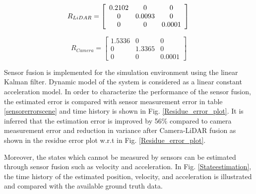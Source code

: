\begin{equation}
    R_{LiDAR} = 
    \left[\begin{array}{ccc}
    0.2102 & 0 & 0 \\
    0 & 0.0093 & 0 \\
    0 & 0 & 0.0001
    \end{array}\right] \\
\end{equation}

\begin{equation}
    R_{Camera} =
    \left[\begin{array}{ccc}
    1.5336 & 0 & 0 \\
    0 & 1.3365 & 0 \\
    0 & 0 & 0.0001
    \end{array}\right]
\end{equation}

Sensor fusion is implemented for the simulation environment using the linear Kalman filter. Dynamic model of the system is considered as a linear constant acceleration model. In order to characterize the performance of the sensor fusion, the estimated error is compared with sensor measurement error in table \ref{sensorerrorscene} and time history is shown in Fig. \ref{Residue_error_plot}. It is inferred that the estimation error is improved by 56\% compared to camera measurement error and reduction in variance after Camera-LiDAR fusion as shown in the residue error plot w.r.t in Fig. \ref{Residue_error_plot}. 

Moreover, the states which cannot be measured by sensors can be estimated through sensor fusion such as velocity and acceleration. In Fig. \ref{Stateestimation}, the time history of the estimated position, velocity, and acceleration is illustrated and compared with the available ground truth data.

